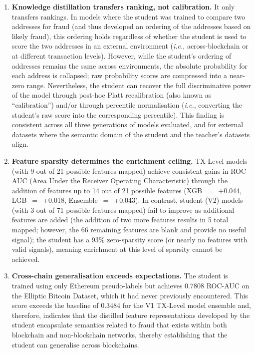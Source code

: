 \documentclass[journal]{IEEEtran}
\newcommand{\ie}{\textit{i.e.}}
\begin{document}
\begin{enumerate}
\item \textbf{Knowledge distillation transfers ranking, not calibration.} It only transfers rankings. In models where the student was trained to compare two addresses for fraud (and thus developed an ordering of the addresses based on likely fraud), this ordering holds regardless of whether the student is used to score the two addresses in an external environment (\ie, across-blockchain or at different transaction levels). However, while the student's ordering of addresses remains the same across environments, the absolute probability for each address is collapsed; raw probability scores are compressed into a near-zero range. Nevertheless, the student can recover the full discriminative power of the model through post-hoc Platt recalibration (also known as ``calibration'') and/or through percentile normalisation (\ie, converting the student's raw score into the corresponding percentile). This finding is consistent across all three generations of models evaluated, and for external datasets where the semantic domain of the student and the teacher's datasets align.

\item \textbf{Feature sparsity determines the enrichment ceiling.} TX-Level models (with 9 out of 21 possible features mapped) achieve consistent gains in ROC-AUC (Area Under the Receiver Operating Characteristic) through the addition of features up to 14 out of 21 possible features (XGB~$=$~+0.044, LGB~$=$~+0.018, Ensemble~$=$~+0.043). In contrast, student (V2) models (with 3 out of 71 possible features mapped) fail to improve as additional features are added (the addition of two more features results in 5 total mapped; however, the 66 remaining features are blank and provide no useful signal); the student has a 93\% zero-sparsity score (or nearly no features with valid signals), meaning enrichment at this level of sparsity cannot be achieved.

\item \textbf{Cross-chain generalisation exceeds expectations.} The student is trained using only Ethereum pseudo-labels but achieves 0.7808 ROC-AUC on the Elliptic Bitcoin Dataset, which it had never previously encountered. This score exceeds the baseline of 0.3484 for the V1 TX-Level model ensemble and, therefore, indicates that the distilled feature representations developed by the student encapsulate semantics related to fraud that exists within both blockchain and non-blockchain networks, thereby establishing that the student can generalise across blockchains.


\end{enumerate}
\end{document}
